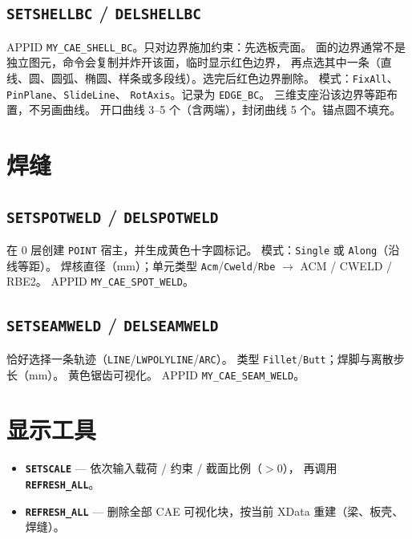 \documentclass[a4paper]{ltxdoc}
\newcommand{\cadcmd}[1]{\texttt{\textbf{#1}}}
\newcommand{\appid}[1]{\texttt{#1}}
\begin{document}
\subsection{\cadcmd{SETSHELLBC} / \cadcmd{DELSHELLBC}}
APPID \appid{MY\_CAE\_SHELL\_BC}。只对边界施加约束：先选板壳面。
面的边界通常不是独立图元，命令会复制并炸开该面，临时显示红色边界，
再点选其中一条（直线、圆、圆弧、椭圆、样条或多段线）。选完后红色边界删除。
模式：\texttt{FixAll}、\texttt{PinPlane}、\texttt{SlideLine}、
\texttt{RotAxis}。记录为 \texttt{EDGE\_BC}。
三维支座沿该边界等距布置，不另画曲线。
开口曲线 3--5 个（含两端），封闭曲线 5 个。锚点圆不填充。

\section{焊缝}

\subsection{\cadcmd{SETSPOTWELD} / \cadcmd{DELSPOTWELD}}
在 0 层创建 \texttt{POINT} 宿主，并生成黄色十字圆标记。
模式：\texttt{Single} 或 \texttt{Along}（沿线等距）。
焊核直径（mm）；单元类型 \texttt{Acm}/\texttt{Cweld}/\texttt{Rbe}
$\rightarrow$ ACM / CWELD / RBE2。
APPID \appid{MY\_CAE\_SPOT\_WELD}。

\subsection{\cadcmd{SETSEAMWELD} / \cadcmd{DELSEAMWELD}}
恰好选择一条轨迹（\texttt{LINE}/\texttt{LWPOLYLINE}/\texttt{ARC}）。
类型 \texttt{Fillet}/\texttt{Butt}；焊脚与离散步长（mm）。
黄色锯齿可视化。
APPID \appid{MY\_CAE\_SEAM\_WELD}。

\section{显示工具}

\begin{itemize}[nosep]
  \item \cadcmd{SETSCALE} --- 依次输入载荷 / 约束 / 截面比例（$>0$），
        再调用 \cadcmd{REFRESH\_ALL}。
  \item \cadcmd{REFRESH\_ALL} --- 删除全部 CAE 可视化块，按当前 XData
        重建（梁、板壳、焊缝）。
\end{itemize}
\end{document}
